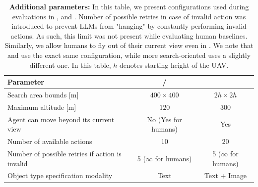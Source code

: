 \begin{table}[th]
\centering
\caption{\textbf{Additional parameters:} In this table, we present configurations used during evaluations in \challenge{}, \anomalychallenge{} and \hardchallenge{}. Number of possible retries in case of invalid action was introduced to prevent LLMs from "hanging" by constantly performing invalid actions. As such, this limit was not present while evaluating human baselines. Similarly, we allow humans to fly out of their current view even in \challenge{}. We note that \challenge{} and \anomalychallenge{} use the exact same configuration, while more search-oriented \hardchallenge{} uses a slightly different one. In this table, \(h\) denotes starting height of the UAV. }
\begin{scriptsize}
\begin{tabular}{lcc}
\toprule

Parameter & \challenge{} / \anomalychallenge{} &\hardchallenge{} \\
\midrule 

Search area bounds [m] & \(400 \times 400\) & \(2h \times 2h\) \\ 
Maximum altitude [m] & \(120\) & \(300\) \\ 
Agent can move beyond its current view & No (Yes for humans) & Yes \\ 
Number of available actions & 10 & 20 \\
Number of possible retries if action is invalid & 5 (\(\infty\) for humans) & 5 (\(\infty\) for humans) \\
Object type specification modality & Text & Text + Image \\ 

\bottomrule
\end{tabular}
\end{scriptsize}

\label{scenario-params}

\end{table}